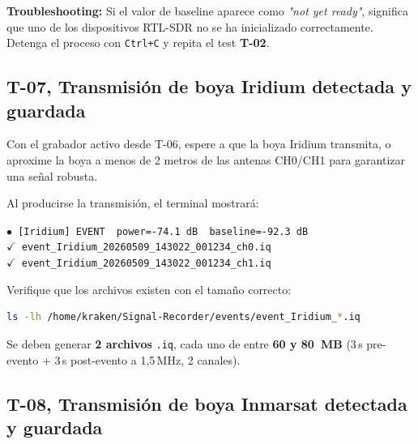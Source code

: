 \begin{important}
    \textbf{Troubleshooting:} Si el valor de baseline aparece como \textit{"not yet ready"}, significa que uno de los dispositivos RTL-SDR no se ha inicializado correctamente. Detenga el proceso con \texttt{Ctrl+C} y repita el test \textbf{T-02}.
\end{important}

\subsection{T-07, Transmisión de boya Iridium detectada y guardada}

Con el grabador activo desde T-06, espere a que la boya Iridium transmita, o aproxime la boya a menos de 2 metros de las antenas CH0/CH1 para garantizar una señal robusta.

\begin{tcolorbox}[colback=gray!5, colframe=deyposcolor, title=Resultado esperado (T-07)]
Al producirse la transmisión, el terminal mostrará:
\vspace{0.2cm}
\begin{center}
    \texttt{\textcolor{orange!80!black}{$\bullet$} [Iridium] EVENT \ power=-74.1 dB \ baseline=-92.3 dB} \\
    \texttt{\quad \textcolor{green!60!black}{$\checkmark$} event\_Iridium\_20260509\_143022\_001234\_ch0.iq} \\
    \texttt{\quad \textcolor{green!60!black}{$\checkmark$} event\_Iridium\_20260509\_143022\_001234\_ch1.iq}
\end{center}
\end{tcolorbox}

Verifique que los archivos existen con el tamaño correcto:

\begin{lstlisting}[language=bash]
ls -lh /home/kraken/Signal-Recorder/events/event_Iridium_*.iq
\end{lstlisting}

\begin{tcolorbox}[colback=gray!5, colframe=deyposcolor, title=Verificación de archivos (T-07)]
Se deben generar \textbf{2 archivos} \texttt{.iq}, cada uno de entre \textbf{60 y 80~MB} (3\,s pre-evento + 3\,s post-evento a 1,5\,MHz, 2 canales).
\end{tcolorbox}

\subsection{T-08, Transmisión de boya Inmarsat detectada y guardada}

